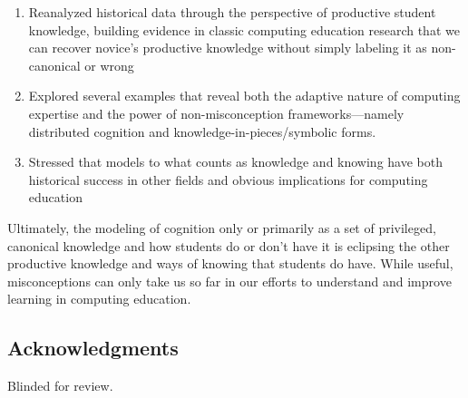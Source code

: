 \begin{enumerate}
  \tightlist
  \item Reanalyzed historical data through the perspective of productive student knowledge, building evidence in classic computing education research that we can recover novice's productive knowledge without simply labeling it as non-canonical or wrong
  \item Explored several examples that reveal both the adaptive nature of computing expertise and the power of non-misconception frameworks---namely distributed cognition and knowledge-in-pieces/symbolic forms.
  \item Stressed that models to what counts as knowledge and knowing have both historical success in other fields and obvious implications for computing education
\end{enumerate}

Ultimately, the modeling of cognition only or primarily as a set of privileged, canonical knowledge and how students do or don't have it is eclipsing the other productive knowledge and ways of knowing that students do have. While useful, misconceptions can only take us so far in our efforts to understand and improve learning in computing education.

\subsection{Acknowledgments}\label{acknowledgments}

Blinded for review.

\clearpage



